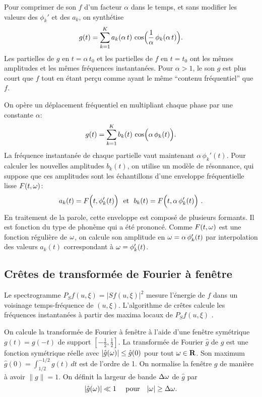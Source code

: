 Pour comprimer de son $f$ d'un facteur $\alpha$ dans le temps, et sans 
modifier les valeurs des $\phi_k'$ et des $a_k$, on synth\'{e}tise
\begin{equation}
\label{Accelerate-sound}
g (t) =  \sum_{k=1}^K a_k (\alpha\, t)\,
\cos \Bigl( \frac 1 \alpha \,\phi_k (\alpha\, t) \Bigr) .
\end{equation}
Les partielles de $g$ en $t = \alpha \, t_0$ et les partielles de $f$ 
en $t = t_0$ ont les m\^{e}mes amplitudes et les m\^{e}mes 
fr\'{e}quences instantan\'{e}es. Pour $\alpha >	1$, le son $g$ est 
plus court que $f$ tout en \'{e}tant per\c{c}u comme ayant le 
m\^{e}me ``contenu fr\'{e}quentiel'' que $f$.

On op\`{e}re un d\'{e}placement fr\'{e}quentiel en multipliant chaque 
phase par une constante $\alpha$:
\begin{equation}
\label{Transpose-sound}
g (t) =  \sum_{k=1}^K b_k (t)\,
\cos \Bigl( \alpha\, \phi_k (t ) \Bigr) .
\end{equation}
La fr\'{e}quence instantan\'{e}e de chaque partielle vaut maintenant 
$\alpha \, \phi_k'(t)$. Pour calculer les nouvelles amplitudes $b_k (t)$, 
on utilise un mod\`{e}le de r\'{e}sonnance, qui suppose que ces 
amplitudes sont les \'{e}chantillons d'une enveloppe fr\'{e}quentielle 
lisse $F(t,	{\omega})$:
\[
a_k (t) = F\Bigl(t, \phi_k'(t) \Bigr) ~~\mbox{et}~~
b_k (t) = F\Bigl(t, \alpha\, \phi_k'(t) \Bigr) ~.
\]
En traitement de la parole, cette enveloppe est compos\'e de plusieurs
{formants\/}. 
Il est fonction du type de phon\`{e}me qui a \'{e}t\'{e} 
prononc\'{e}. Comme $F(t,{\omega})$ est une fonction r\'{e}guli\`{e}re
de ${\omega}$, on calcule son amplitude en ${\omega}	= \alpha\, \phi_k'(t)$ par 
interpolation des valeurs $a_k (t)$	correspondant \`{a} ${\omega} = \phi_k'(t)$.

\subsection{Cr\^{e}tes de transform\'ee de Fourier \`a fen\^{e}tre}
\label{sec-wind-four-ridges}

Le spectrogramme $P_S f(u,\xi)= |Sf(u,\xi)|^2$
mesure l'\'{e}nergie de $f$ dans un voisinage temps-fr\'{e}quence de $(u,\xi)$.
L'algorithme de cr\^{e}tes calcule les fr\'{e}quences 
instantan\'{e}es \`{a} partir des maxima locaux de $P_S	f(u,\xi)$
\cite{torresani}.

On calcule la transform\'{e}e de Fourier \`a fen\^{e}tre \`{a} 
l'aide d'une fen\^{e}tre sym\'{e}trique $g(t) =	g(-t)$ de support
$[-\frac	1 2	, \frac	1 2]$. La transform\'{e}e de Fourier $\hat g$ de 
$g$ est une fonction sym\'{e}trique r\'{e}elle avec
$|\hat g	({\omega})| \leq	\hat g (0)$	pour tout	${\omega} \in {\bf{R}}$.
Son maximum $\hat g(0) =	\int_{1/2}^{-1/2} g(t)\,dt$ est de l'ordre de 
1. 
On normalise la fen\^{e}tre $g$ de mani\`{e}re 
\`{a} avoir $\|g\| = 1$. 
On d\'efinit la largeur de bande $\Delta {\omega}$ de
$\hat g$ par
\begin{equation}
\label{Band-widt-g}
|\hat g({\omega})| \ll 1 ~~~
\mbox{
pour}~~~ |{\omega}| \geq \Delta {\omega}.
\end{equation}

